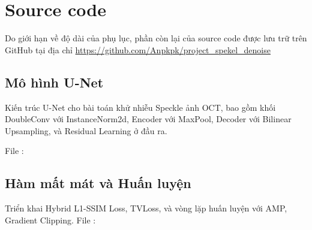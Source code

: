 
\chapter{Source code} %

\label{AppendixB} %

Do giới hạn về độ dài của phụ lục, phần còn lại của source code được lưu trữ trên GitHub tại địa chỉ \url{https://github.com/Anpkpk/project_spekel_denoise}

\section{Mô hình U-Net}
Kiến trúc U-Net cho bài toán khử nhiễu Speckle ảnh OCT, bao gồm khối DoubleConv với InstanceNorm2d, Encoder với MaxPool, Decoder với Bilinear Upsampling, và Residual Learning ở đầu ra.

File :


\newpage

\section{Hàm mất mát và Huấn luyện}
Triển khai Hybrid L1-SSIM Loss, TVLoss, và vòng lặp huấn luyện với AMP, Gradient Clipping.
File :

